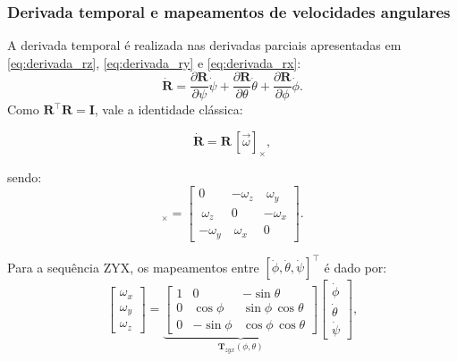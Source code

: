 \subsubsection{Derivada temporal e mapeamentos de velocidades angulares}
A derivada temporal é realizada nas derivadas parciais apresentadas em \eqref{eq:derivada_rz}, \eqref{eq:derivada_ry} e \eqref{eq:derivada_rx}:
\begin{equation}
\dot{\mathbf R}=\frac{\partial \mathbf R}{\partial \psi}\dot\psi+\frac{\partial \mathbf R}{\partial \theta}\dot\theta+\frac{\partial \mathbf R}{\partial \phi}\dot\phi.
\end{equation}
Como $\mathbf R^\top\mathbf R=\mathbf I$, vale a identidade clássica:

\begin{equation}
\dot{\mathbf R}=\mathbf R\,[\vec\omega]_\times,
\end{equation}

sendo:
\begin{equation}
[\vec\omega]_\times=
\begin{bmatrix}
0&-\omega_z&\ \omega_y\\
\ \omega_z&0&-\omega_x\\
-\omega_y&\ \omega_x&0
\end{bmatrix}.
\end{equation}

Para a sequência ZYX, os mapeamentos entre $[\dot\phi,\dot\theta,\dot\psi]^\top$ é dado por:
\begin{equation}
\begin{bmatrix}\omega_x\\ \omega_y\\ \omega_z\end{bmatrix}=
\underbrace{\begin{bmatrix}
1 & 0 & -\sin\theta\\
0 & \cos\phi & \sin\phi\,\cos\theta\\
0 & -\sin\phi & \cos\phi\,\cos\theta
\end{bmatrix}}_{\displaystyle \mathbf T_{zyx}(\phi,\theta)}
\begin{bmatrix}\dot\phi\\ \dot\theta\\ \dot\psi\end{bmatrix},
\end{equation}


